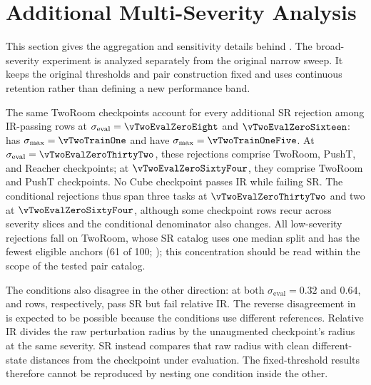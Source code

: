 \section{Additional Multi-Severity Analysis}
\label{sec:appendix-multiseverity}

\providecommand{\vTwoNumberMacros}{tables/multiseverity_numbers}

\providecommand{\vTwoAssociationTable}{tables/table_multiseverity_associations}
\providecommand{\vTwoDecisionTable}{tables/table_multiseverity_decisions}

This section gives the aggregation and sensitivity details behind
. The broad-severity experiment is
analyzed separately from the original narrow sweep. It keeps the original
thresholds and pair construction fixed and uses continuous retention rather
than defining a new performance band.

The same \vTwoVetoAtZeroEight{} TwoRoom checkpoints account for every
additional SR rejection among IR-passing rows at
$\sigma_{\mathrm{eval}}=\vTwoEvalZeroEight$ and
$\vTwoEvalZeroSixteen$: \vTwoLowVetoAtOne{} has
$\sigma_{\max}=\vTwoTrainOne$ and \vTwoLowVetoAtOneFive{} have
$\sigma_{\max}=\vTwoTrainOneFive$. At
$\sigma_{\mathrm{eval}}=\vTwoEvalZeroThirtyTwo$, these rejections comprise
\vTwoVetoThirtyTwoTwoRoom{} TwoRoom, \vTwoVetoThirtyTwoPushT{} PushT, and
\vTwoVetoThirtyTwoReacher{} Reacher checkpoints; at
$\vTwoEvalZeroSixtyFour$, they comprise
\vTwoVetoSixtyFourTwoRoom{} TwoRoom and \vTwoVetoSixtyFourPushT{} PushT
checkpoints. No Cube checkpoint passes IR while failing SR. The conditional
rejections thus
span three tasks at $\vTwoEvalZeroThirtyTwo$ and two at
$\vTwoEvalZeroSixtyFour$, although some checkpoint rows recur across severity
slices and the conditional denominator also changes. All low-severity
rejections fall on TwoRoom, whose SR catalog uses one median split and has the
fewest eligible anchors (61 of 100; \vTwoSRLabelReference); this concentration should be
read within the scope of the tested pair catalog.


\FloatBarrier

The conditions also disagree in the other direction: at both
$\sigma_{\mathrm{eval}}=0.32$ and $0.64$,
\vTwoSROnlyPassAtZeroThirtyTwo{} and \vTwoSROnlyPassAtZeroSixtyFour{} rows,
respectively, pass SR but fail relative IR.
The reverse disagreement in
 is expected to be possible
because the conditions use different references. Relative IR divides the raw
perturbation radius by the unaugmented checkpoint's radius at the same
severity. SR instead compares that raw radius with clean different-state
distances from the checkpoint under evaluation. The fixed-threshold results
therefore cannot be reproduced by nesting one condition inside the other.


